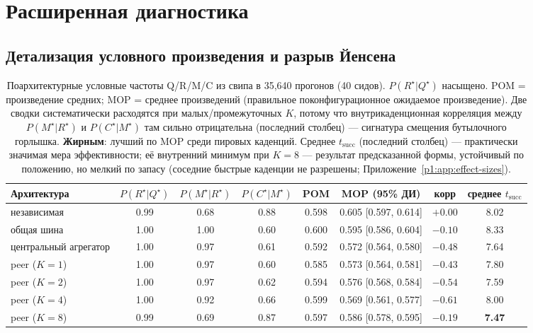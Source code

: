 \documentclass{article}
\begin{document}
\section{Расширенная диагностика}
\label{p1:app:diagnostics}

\subsection{Детализация условного произведения и разрыв Йенсена}
\label{p1:app:phi-detail}

\begin{table}[h]
\caption{Поархитектурные условные частоты Q/R/M/C из свипа в 35{,}640 прогонов (40 сидов). $P(R^\star|Q^\star)$ насыщено. POM = произведение средних; MOP = среднее произведений (правильное поконфигурационное ожидаемое произведение). Две сводки систематически расходятся при малых/промежуточных $K$, потому что внутрикаденционная корреляция между $P(M^\star|R^\star)$ и $P(C^\star|M^\star)$ там сильно отрицательна (последний столбец) --- сигнатура смещения бутылочного горлышка. \textbf{Жирным}: лучший по MOP среди пировых каденций. Среднее $t_{\mathrm{succ}}$ (последний столбец) --- практически значимая мера эффективности; её внутренний минимум при $K=8$ --- результат предсказанной формы, устойчивый по положению, но мелкий по запасу (соседние быстрые каденции не разрешены; Приложение~\ref{p1:app:effect-sizes}).}
\label{p1:tab:multi-agent-cond}
\centering
\scriptsize
\setlength{\tabcolsep}{3.5pt}
\begin{tabular}{l c c c c c c c}
\toprule
Архитектура & $P(R^\star|Q^\star)$ & $P(M^\star|R^\star)$ & $P(C^\star|M^\star)$ & POM & MOP (95\% ДИ) & корр & среднее $t_{\mathrm{succ}}$ \\
\midrule
независимая          & 0.99 & 0.68 & 0.88 & 0.598 & 0.605 [0.597, 0.614] & $+0.00$ & 8.02 \\
общая шина           & 1.00 & 1.00 & 0.60 & 0.600 & 0.595 [0.586, 0.604] & $-0.10$ & 8.33 \\
центральный агрегатор   & 1.00 & 0.97 & 0.61 & 0.592 & 0.572 [0.564, 0.580] & $-0.48$ & 7.64 \\
peer ($K=1$)         & 1.00 & 0.97 & 0.60 & 0.585 & 0.573 [0.564, 0.581] & $-0.43$ & 7.80 \\
peer ($K=2$)         & 1.00 & 0.97 & 0.62 & 0.594 & 0.576 [0.568, 0.584] & $-0.54$ & 7.59 \\
peer ($K=4$)         & 1.00 & 0.92 & 0.66 & 0.599 & 0.569 [0.561, 0.577] & $-0.61$ & 8.00 \\
peer ($K=8$)         & 0.99 & 0.69 & 0.87 & 0.597 & 0.586 [0.578, 0.595] & $-0.19$ & \textbf{7.47} \\

\end{tabular}
\end{table}
\end{document}
